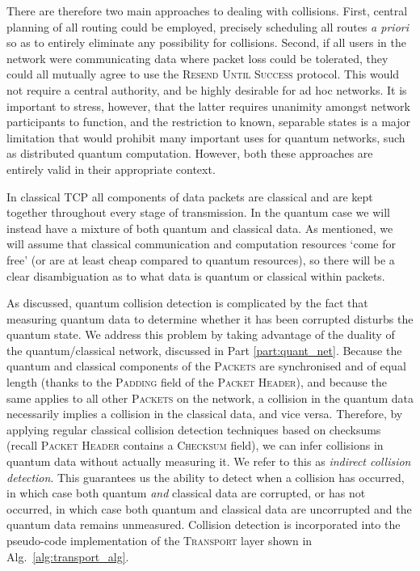 There are therefore two main approaches to dealing with collisions. First, central planning of all routing could be employed, precisely scheduling all routes \textit{a priori} so as to entirely eliminate any possibility for collisions. Second, if all users in the network were communicating data where packet loss could be tolerated, they could all mutually agree to use the \textsc{Resend Until Success} protocol. This would not require a central authority, and be highly desirable for ad hoc networks. It is important to stress, however, that the latter requires unanimity amongst network participants to function, and the restriction to known, separable states is a major limitation that would prohibit many important uses for quantum networks, such as distributed quantum computation. However, both these approaches are entirely valid in their appropriate context.

In classical TCP all components of data packets are classical and are kept together throughout every stage of transmission. In the quantum case we will instead have a mixture of both quantum and classical data. As mentioned, we will assume that classical communication and computation resources `come for free' (or are at least cheap compared to quantum resources), so there will be a clear disambiguation as to what data is quantum or classical within packets.

As discussed, quantum collision detection is complicated by the fact that measuring quantum data to determine whether it has been corrupted disturbs the quantum state. We address this problem by taking advantage of the duality of the quantum/classical network, discussed in Part \ref{part:quant_net}. Because the quantum and classical components of the \textsc{Packets} are synchronised and of equal length (thanks to the \textsc{Padding} field of the \textsc{Packet Header}), and because the same applies to all other \textsc{Packets} on the network, a collision in the quantum data necessarily implies a collision in the classical data, and vice versa. Therefore, by applying regular classical collision detection techniques based on checksums (recall \textsc{Packet Header} contains a \textsc{Checksum} field), we can infer collisions in quantum data without actually measuring it. We refer to this as \textit{indirect collision detection}. This guarantees us the ability to detect when a collision has occurred, in which case both quantum \textit{and} classical data are corrupted, or has not occurred, in which case both quantum and classical data are uncorrupted and the quantum data remains unmeasured. Collision detection is incorporated into the pseudo-code implementation of the \textsc{Transport} layer shown in Alg.~\ref{alg:transport_alg}.


